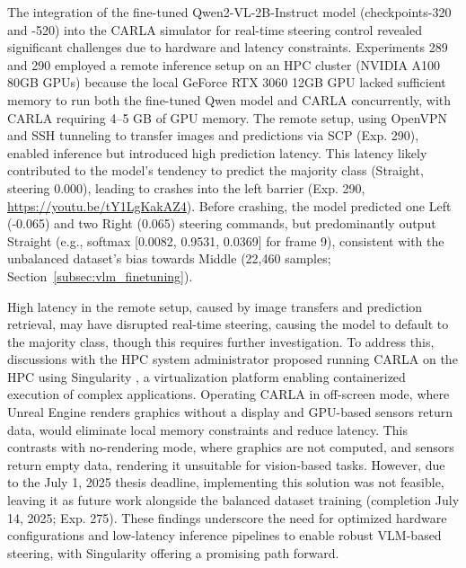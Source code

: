 The integration of the fine-tuned Qwen2-VL-2B-Instruct model (checkpoints-320 and -520) into the CARLA simulator \cite{Dosovitskiy2017} for real-time steering control revealed significant challenges due to hardware and latency constraints. Experiments 289 and 290 employed a remote inference setup on an HPC cluster (NVIDIA A100 80GB GPUs) because the local GeForce RTX 3060 12GB GPU lacked sufficient memory to run both the fine-tuned Qwen model and CARLA concurrently, with CARLA requiring 4--5 GB of GPU memory. The remote setup, using OpenVPN and SSH tunneling to transfer images and predictions via SCP (Exp. 290), enabled inference but introduced high prediction latency. This latency likely contributed to the model's tendency to predict the majority class (Straight, steering 0.000), leading to crashes into the left barrier (Exp. 290, \url{https://youtu.be/tY1LgKakAZ4}). Before crashing, the model predicted one Left (-0.065) and two Right (0.065) steering commands, but predominantly output Straight (e.g., softmax [0.0082, 0.9531, 0.0369] for frame 9), consistent with the unbalanced dataset's bias towards Middle (22,460 samples; Section~\ref{subsec:vlm_finetuning}).

High latency in the remote setup, caused by image transfers and prediction retrieval, may have disrupted real-time steering, causing the model to default to the majority class, though this requires further investigation. To address this, discussions with the HPC system administrator proposed running CARLA on the HPC using Singularity \cite{kurtzer2017singularity}, a virtualization platform enabling containerized execution of complex applications. Operating CARLA in off-screen mode, where Unreal Engine renders graphics without a display and GPU-based sensors return data, would eliminate local memory constraints and reduce latency. This contrasts with no-rendering mode, where graphics are not computed, and sensors return empty data, rendering it unsuitable for vision-based tasks. However, due to the July 1, 2025 thesis deadline, implementing this solution was not feasible, leaving it as future work alongside the balanced dataset training (completion July 14, 2025; Exp. 275). These findings underscore the need for optimized hardware configurations and low-latency inference pipelines to enable robust VLM-based steering, with Singularity offering a promising path forward.

